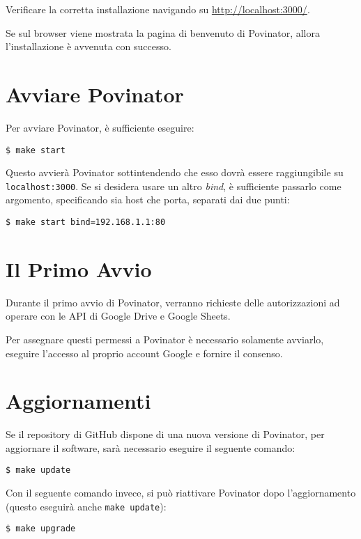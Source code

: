 \documentclass[12pt]{report}
\begin{document}
Verificare la corretta installazione navigando su
\url{http://localhost:3000/}.

Se sul browser viene mostrata la pagina di benvenuto di Povinator,
allora l'installazione è avvenuta con successo.

\section{Avviare Povinator}

Per avviare Povinator, è sufficiente eseguire:

\begin{verbatim}
$ make start
\end{verbatim}

Questo avvierà Povinator sottintendendo che esso dovrà essere raggiungibile su \texttt{localhost:3000}.
Se si desidera usare un altro \emph{bind}, è sufficiente passarlo come argomento, specificando sia host che porta, separati dai due punti:

\begin{verbatim}
$ make start bind=192.168.1.1:80
\end{verbatim}

\section{Il Primo Avvio}

Durante il primo avvio di Povinator, verranno richieste delle autorizzazioni ad operare con le API di Google Drive e Google Sheets.

Per assegnare questi permessi a Povinator è necessario solamente avviarlo, eseguire l'accesso al proprio account Google e fornire il consenso.


\section{Aggiornamenti}

Se il repository di GitHub dispone di una nuova versione di Povinator, per aggiornare il software, sarà necessario eseguire il seguente comando:

\begin{verbatim}
$ make update
\end{verbatim}

Con il seguente comando invece, si può riattivare Povinator dopo l'aggiornamento (questo eseguirà anche \texttt{make update}):

\begin{verbatim}
$ make upgrade
\end{verbatim}
\end{document}
